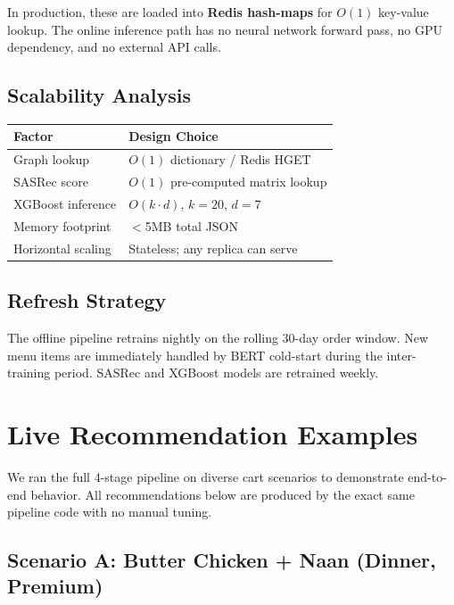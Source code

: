 \documentclass[10pt, twocolumn, a4paper]{article}
\begin{document}
In production, these are loaded into \textbf{Redis hash-maps} for $O(1)$ key-value lookup. The online inference path has no neural network forward pass, no GPU dependency, and no external API calls.

\subsection{Scalability Analysis}

\begin{center}
\small
\begin{tabular}{@{}l l@{}}
\toprule
\textbf{Factor} & \textbf{Design Choice} \\
\midrule
Graph lookup & $O(1)$ dictionary / Redis HGET \\
SASRec score & $O(1)$ pre-computed matrix lookup \\
XGBoost inference & $O(k \cdot d)$, $k{=}20$, $d{=}7$ \\
Memory footprint & $<$5MB total JSON \\
Horizontal scaling & Stateless; any replica can serve \\
\bottomrule
\end{tabular}
\end{center}

\subsection{Refresh Strategy}

The offline pipeline retrains nightly on the rolling 30-day order window. New menu items are immediately handled by BERT cold-start during the inter-training period. SASRec and XGBoost models are retrained weekly.

\section{Live Recommendation Examples}

We ran the full 4-stage pipeline on diverse cart scenarios to demonstrate end-to-end behavior. All recommendations below are produced by the exact same pipeline code with no manual tuning.

\subsection{Scenario A: Butter Chicken + Naan (Dinner, Premium)}
\end{document}
